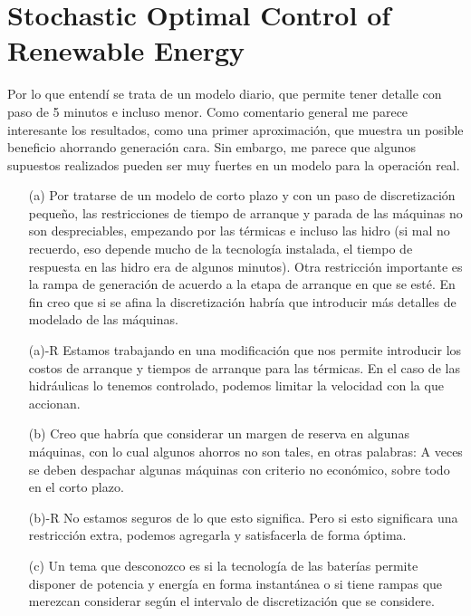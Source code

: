 \documentclass[12pt]{article}
\theoremstyle{definition}
\theoremstyle{remark}
\begin{document}
\section*{Stochastic Optimal Control of Renewable Energy}

Por lo que entendí se trata de un modelo diario, que permite tener detalle con paso de 5 minutos e incluso menor. Como comentario general me parece interesante los resultados, como una primer aproximación, que muestra un posible beneficio ahorrando generación cara. Sin embargo, me parece que algunos supuestos realizados pueden ser muy fuertes en un modelo para la operación real.

\begin{enumerate}

\item[(a)] Por tratarse de un modelo de corto plazo y con un paso de discretización pequeño, las restricciones de tiempo de arranque y parada de las máquinas no son despreciables, empezando por las térmicas e incluso las hidro (si mal no recuerdo, eso depende mucho de la tecnología instalada, el tiempo de respuesta en las hidro era de algunos minutos). Otra restricción importante es la rampa de generación de acuerdo a la etapa de arranque en que se esté. En fin creo que si se afina la discretización habría que introducir más detalles de modelado de las máquinas.

\item[(a)-R] Estamos trabajando en una modificación que nos permite introducir los costos de arranque y tiempos de arranque para las térmicas. En el caso de las hidráulicas lo tenemos controlado, podemos limitar la velocidad con la que accionan.

\item[(b)] Creo que habría que considerar un margen de reserva en algunas máquinas, con lo cual algunos  ahorros  no son tales, en otras palabras: A veces se deben despachar algunas máquinas con criterio no económico, sobre todo en el corto plazo.

\item[(b)-R] No estamos seguros de lo que esto significa. Pero si esto significara una restricción extra, podemos agregarla y satisfacerla de forma óptima.

\item[(c)] Un tema que desconozco es si la tecnología de las baterías permite disponer de potencia y energía en forma instantánea o si tiene rampas que merezcan considerar según el intervalo de discretización que se considere.


\end{enumerate}
\end{document}
